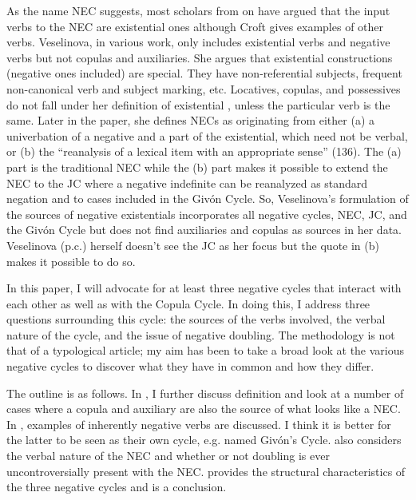 \documentclass[output=paper,draft,draftmode,colorlinks,citecolor=brown]{langscibook}
\begin{document}
As the name NEC suggests, most scholars from \citet{Croft1991} on have
argued that the input verbs to the NEC are existential ones although Croft
gives examples of other verbs. Veselinova, in various work, only includes
existential verbs and negative verbs but not copulas and auxiliaries. She
argues that existential constructions (negative ones included) are special.
They have non-referential subjects, frequent non-canonical verb and subject
marking, etc. Locatives, copulas, and possessives do not fall under her
definition of existential \citep[108--11]{Veselinova2013}, unless the
particular verb is the same. Later in the paper, she defines NECs as
originating from either (a) a univerbation of a negative and a part of the
existential, which need not be verbal, or (b) the ``reanalysis of a lexical
item with an appropriate sense'' (136). The (a) part is the
traditional NEC while the (b) part makes it possible to extend the NEC to
the JC where a negative indefinite can be reanalyzed as standard negation
and to cases included in the Givón Cycle. So, Veselinova's formulation of the
sources of negative existentials incorporates all negative cycles, NEC, JC,
and the Givón Cycle but does not find auxiliaries and copulas as sources in her
data. Veselinova (p.c.) herself doesn't see the JC as her focus but the
quote in (b) makes it possible to do so.

In this paper, I will advocate for at least three negative cycles that
interact with each other as well as with the Copula Cycle. In doing this, I
address three questions surrounding this cycle: the sources of the verbs
involved, the verbal nature of the cycle, and the issue of negative
doubling. The methodology is not that of a typological article; my aim has
been to take a broad look at the various negative cycles to discover what
they have in common and how they differ.

The outline is as follows. In , I further discuss
 definition and look at a number of cases where a
copula and auxiliary are also the source of what looks like a NEC. In
,  examples of inherently negative verbs are
discussed. I think it is better for the latter to be seen as their own
cycle, e.g. named Givón's Cycle.  also considers the
verbal nature of the NEC and  whether or not doubling is ever
uncontroversially present with the NEC.  provides the
structural characteristics of the three negative cycles and
 is a
conclusion.
\end{document}
